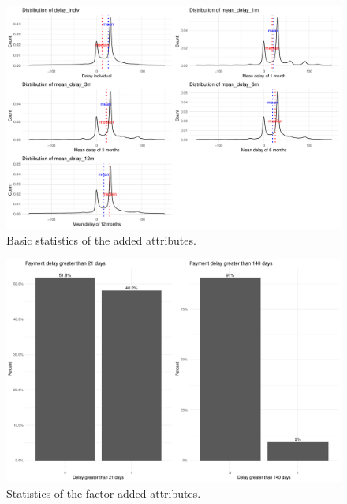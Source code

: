 \documentclass[
]{article}
\begin{document}
\begin{figure}
\centering
\includegraphics{Documentation_Rmarkdown_files/figure-latex/statnew-1.pdf}
\caption{\label{fig:statnew}\label{fig:stat-new}Basic statistics of the added attributes.}
\end{figure}

\begin{figure}
\includegraphics[height=0.4\textheight]{Documentation_Rmarkdown_files/figure-latex/helpnew-1} \caption{\label{fig:help_new} Statistics of the factor added attributes.}\label{fig:helpnew}
\end{figure}
\end{document}
